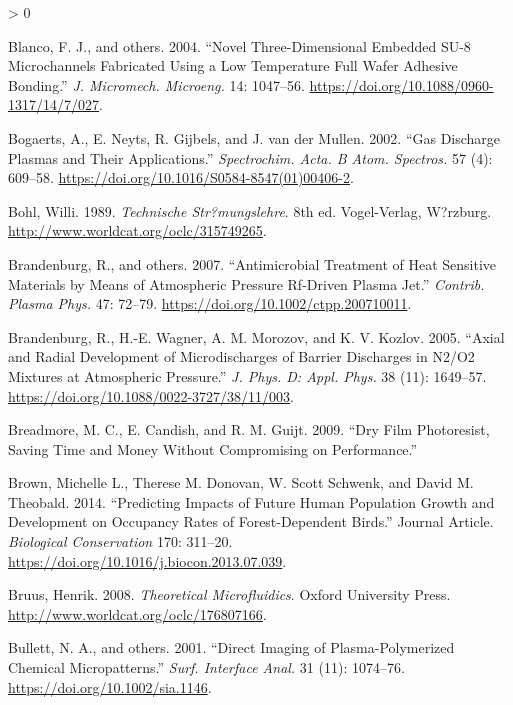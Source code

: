 \documentclass[
  10pt,
  twoside]{article}
\newlength{\cslhangindent}
\newenvironment{CSLReferences}[2] %
 {%
  \setlength{\parindent}{0pt}
  \ifodd #1 \everypar{\setlength{\hangindent}{\cslhangindent}}\ignorespaces\fi
  \ifnum #2 > 0
  \setlength{\parskip}{#2\baselineskip}
  \fi
 }%
 {}
\begin{document}
\begin{CSLReferences}{1}{0}
\leavevmode\hypertarget{ref-Blan04}{}%
Blanco, F. J., and others. 2004. {``Novel Three-Dimensional Embedded {SU-8} Microchannels Fabricated Using a Low Temperature Full Wafer Adhesive Bonding.''} \emph{J. Micromech. Microeng.} 14: 1047--56. \url{https://doi.org/10.1088/0960-1317/14/7/027}.

\leavevmode\hypertarget{ref-Boga02}{}%
Bogaerts, A., E. Neyts, R. Gijbels, and J. van der Mullen. 2002. {``Gas Discharge Plasmas and Their Applications.''} \emph{Spectrochim. Acta. B Atom. Spectros.} 57 (4): 609--58. \url{https://doi.org/10.1016/S0584-8547(01)00406-2}.

\leavevmode\hypertarget{ref-Bohl1989}{}%
Bohl, Willi. 1989. \emph{Technische Str?mungslehre}. 8th ed. Vogel-Verlag, W?rzburg. \url{http://www.worldcat.org/oclc/315749265}.

\leavevmode\hypertarget{ref-Bran07}{}%
Brandenburg, R., and others. 2007. {``Antimicrobial Treatment of Heat Sensitive Materials by Means of Atmospheric Pressure {Rf}-Driven Plasma Jet.''} \emph{Contrib. Plasma Phys.} 47: 72--79. \url{https://doi.org/10.1002/ctpp.200710011}.

\leavevmode\hypertarget{ref-Bran05}{}%
Brandenburg, R., H.-E. Wagner, A. M. Morozov, and K. V. Kozlov. 2005. {``Axial and Radial Development of Microdischarges of Barrier Discharges in {N2/O2} Mixtures at Atmospheric Pressure.''} \emph{J. Phys. D: Appl. Phys.} 38 (11): 1649--57. \url{https://doi.org/10.1088/0022-3727/38/11/003}.

\leavevmode\hypertarget{ref-Brea09}{}%
Breadmore, M. C., E. Candish, and R. M. Guijt. 2009. {``Dry Film Photoresist, Saving Time and Money Without Compromising on Performance.''}

\leavevmode\hypertarget{ref-Brown14}{}%
Brown, Michelle L., Therese M. Donovan, W. Scott Schwenk, and David M. Theobald. 2014. {``Predicting Impacts of Future Human Population Growth and Development on Occupancy Rates of Forest-Dependent Birds.''} Journal Article. \emph{Biological Conservation} 170: 311--20. \url{https://doi.org/10.1016/j.biocon.2013.07.039}.

\leavevmode\hypertarget{ref-Bruu08}{}%
Bruus, Henrik. 2008. \emph{Theoretical Microfluidics}. Oxford University Press. \url{http://www.worldcat.org/oclc/176807166}.

\leavevmode\hypertarget{ref-Bull01}{}%
Bullett, N. A., and others. 2001. {``Direct Imaging of Plasma-Polymerized Chemical Micropatterns.''} \emph{Surf. Interface Anal.} 31 (11): 1074--76. \url{https://doi.org/10.1002/sia.1146}.


\end{CSLReferences}
\end{document}
